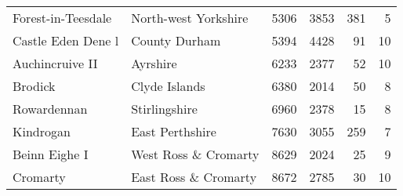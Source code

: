 \begin{table}[ht]
\begin{center}
{\begin{tabular}{llrrrr}
  Forest-in-Teesdale & North-west Yorkshire & 5306 & 3853 & 381 & 5 \\
  Castle Eden Dene l & County Durham & 5394 & 4428 & 91 & 10 \\
  Auchincruive II & Ayrshire & 6233 & 2377 & 52 & 10 \\
  Brodick & Clyde Islands & 6380 & 2014 & 50 & 8 \\
  Rowardennan & Stirlingshire & 6960 & 2378 & 15 & 8 \\
  Kindrogan & East Perthshire & 7630 & 3055 & 259 & 7 \\
  Beinn Eighe I & West Ross \& Cromarty & 8629 & 2024 & 25 & 9 \\
  Cromarty & East Ross \& Cromarty & 8672 & 2785 & 30 & 10 \\
   \bottomrule
\end{tabular}
}
\end{center}
\end{table}
